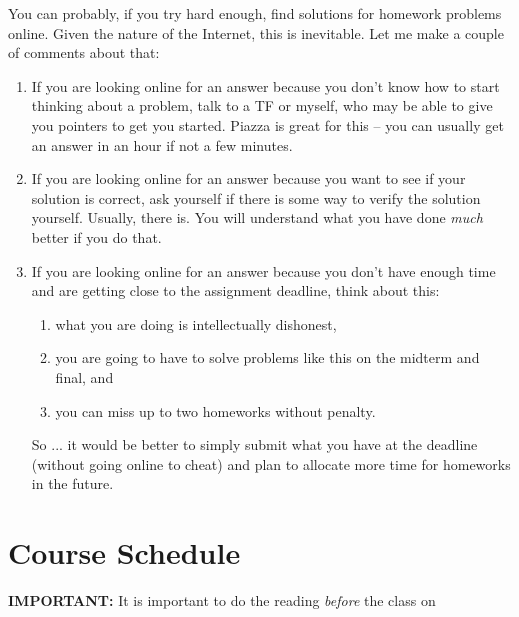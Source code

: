 \documentclass[11pt]{article}
\begin{document}
You can probably, if you try hard enough, find solutions for homework
problems online.    Given the nature of the Internet, this is
inevitable.   Let me make a couple of comments about that:
\begin{enumerate}
\item If you are looking online for an answer because you don't know how
  to start thinking about a problem, talk to a TF or myself, who may be
  able to give you pointers to get you started.  Piazza is great for
  this -- you can usually get an answer in an hour if not a few minutes.
\item If you are looking online for an answer because you want to see if
  your solution is correct, ask yourself if there is some way to verify
  the solution yourself.   Usually, there is.  You will understand what you have done
  \emph{much} better if you do that.
\item If you are looking online for an answer because you don't have
  enough time and are getting close to the assignment deadline, think about this:
  \begin{enumerate}
  \item what you are doing is intellectually dishonest,
  \item you are going to have to solve problems like this on the midterm
    and final, and
  \item you can miss up to two homeworks without penalty.
  \end{enumerate}
So ... it would be better to simply submit what you have at the deadline
(without going online to cheat) and plan to allocate more time for
homeworks in the future.
\end{enumerate}

\newpage
\section*{Course Schedule}

\textbf{IMPORTANT:} It is important to do the reading \emph{before} the class on
\end{document}
